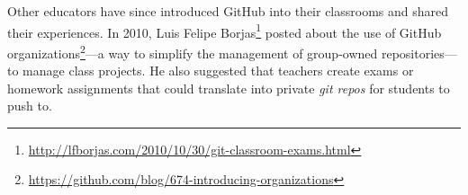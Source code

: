 Other educators have since introduced GitHub into their classrooms and shared their experiences. In 2010, Luis Felipe Borjas\footnote{\url{http://lfborjas.com/2010/10/30/git-classroom-exams.html}} posted about the use of GitHub organizations\footnote{\url{https://github.com/blog/674-introducing-organizations}}---a way to simplify the management of group-owned repositories---to manage class projects. He also suggested that teachers create exams or homework assignments that could translate into private \textit{git repos} for students to push to.



